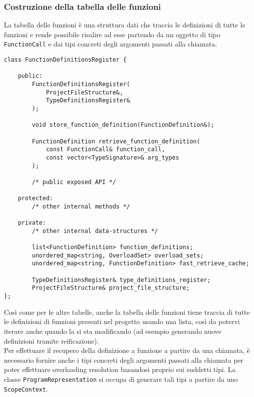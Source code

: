 \subsubsection{Costruzione della tabella delle funzioni}
La tabella delle funzioni è una struttura dati che traccia le definizioni di tutte le funzioni
e rende possibile risalire ad esse partendo da un oggetto di tipo \texttt{FunctionCall} e dai 
tipi concreti degli argomenti passati alla chiamata. \\

\vspace{0.5cm}
\begin{lstlisting}[frame=single]
class FunctionDefinitionsRegister {

    public:
        FunctionDefinitionsRegister(
            ProjectFileStructure&,
            TypeDefinitionsRegister&
        );

        void store_function_definition(FunctionDefinition&);

        FunctionDefinition retrieve_function_definition(
            const FunctionCall& function_call, 
            const vector<TypeSignature>& arg_types
        );

        /* public exposed API */

    protected:
        /* other internal methods */

    private:
        /* other internal data-structures */

        list<FunctionDefinition> function_definitions;
        unordered_map<string, OverloadSet> overload_sets;
        unordered_map<string, FunctionDefinition> fast_retrieve_cache;
        
        TypeDefinitionsRegister& type_definitions_register;
        ProjectFileStructure& project_file_structure;
};
\end{lstlisting}
\vspace{0.5cm}

Così come per le altre tabelle, anche la tabella delle funzioni tiene traccia di tutte le definizioni
di funzioni presenti nel progetto usando una lista, così da potervi iterare anche quando la si sta modificando 
(ad esempio generando nuove definizioni tramite reificazione). \\

Per effettuare il recupero della definizione a funzione a partire da una chiamata, è necessario 
fornire anche i tipi concreti degli argomenti passati alla chiamata per poter effettuare overloading resolution 
basandosi proprio sui suddetti tipi. La classe \texttt{ProgramRepresentation} si occupa di generare tali tipi 
a partire da uno \texttt{ScopeContext}. \\


